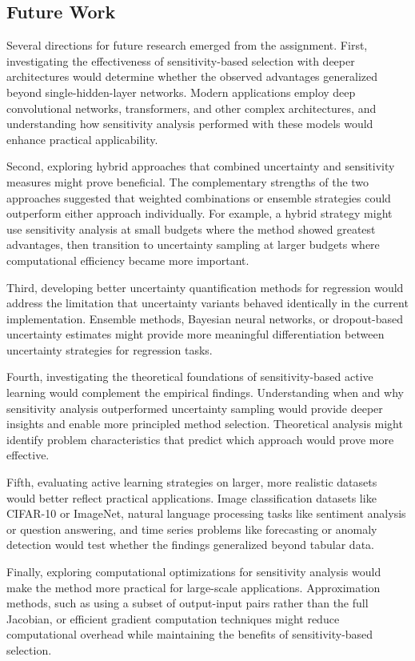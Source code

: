 \documentclass[conference]{IEEEtran}
\begin{document}
\subsection{Future Work}

Several directions for future research emerged from the assignment. First, investigating the effectiveness of sensitivity-based selection with deeper architectures would determine whether the observed advantages generalized beyond single-hidden-layer networks. Modern applications employ deep convolutional networks, transformers, and other complex architectures, and understanding how sensitivity analysis performed with these models would enhance practical applicability.

Second, exploring hybrid approaches that combined uncertainty and sensitivity measures might prove beneficial. The complementary strengths of the two approaches suggested that weighted combinations or ensemble strategies could outperform either approach individually. For example, a hybrid strategy might use sensitivity analysis at small budgets where the method showed greatest advantages, then transition to uncertainty sampling at larger budgets where computational efficiency became more important.

Third, developing better uncertainty quantification methods for regression would address the limitation that uncertainty variants behaved identically in the current implementation. Ensemble methods, Bayesian neural networks, or dropout-based uncertainty estimates might provide more meaningful differentiation between uncertainty strategies for regression tasks.

Fourth, investigating the theoretical foundations of sensitivity-based active learning would complement the empirical findings. Understanding when and why sensitivity analysis outperformed uncertainty sampling would provide deeper insights and enable more principled method selection. Theoretical analysis might identify problem characteristics that predict which approach would prove more effective.

Fifth, evaluating active learning strategies on larger, more realistic datasets would better reflect practical applications. Image classification datasets like CIFAR-10 or ImageNet, natural language processing tasks like sentiment analysis or question answering, and time series problems like forecasting or anomaly detection would test whether the findings generalized beyond tabular data.

Finally, exploring computational optimizations for sensitivity analysis would make the method more practical for large-scale applications. Approximation methods, such as using a subset of output-input pairs rather than the full Jacobian, or efficient gradient computation techniques might reduce computational overhead while maintaining the benefits of sensitivity-based selection.
\end{document}
